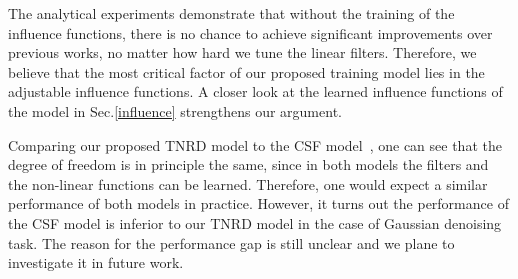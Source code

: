 \documentclass[10pt,journal,compsoc]{IEEEtran}
\begin{document}
The analytical experiments demonstrate that without the training of the influence functions, there is no chance to achieve 
significant improvements over previous works, 
no matter how hard we tune the linear filters. {Therefore, we believe that 
the most critical factor of our proposed training model lies in the adjustable 
influence functions.} 
A closer look at the learned influence functions of the 
 model in Sec.\ref{influence} strengthens our argument. 
  
Comparing our proposed TNRD model to the CSF model~\cite{CSF2014}, one
can see that the degree of freedom is in principle the same, since in
both models the filters and the non-linear functions can be
learned. Therefore, one would expect a similar performance of both
models in practice. However, it turns out the performance of the CSF
model is inferior to our TNRD model in the case of Gaussian denoising
task. The reason for the performance gap is still unclear and
we plane to investigate it in future work.
\end{document}
